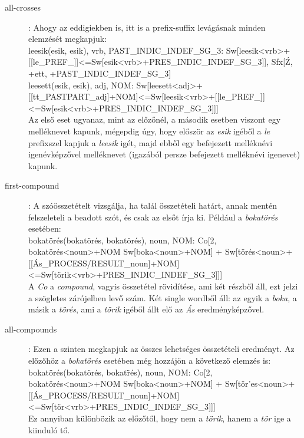 \documentclass{article}
\begin{document}
\begin{description}
\item[all-crosses]: Ahogy az eddigiekben is, itt is a prefix-suffix lev\'ag\'asnak minden elemz\'es\'et megkapjuk: \\

leesik(esik, esik), vrb, PAST\_INDIC\_INDEF\_SG\_3: Sw[leesik<vrb>+[[le\_PREF\_]]<=Sw[esik<vrb>+{PRES\_INDIC\_INDEF\_SG\_3}]], Sfx[Ź, +ett, +{PAST\_INDIC\_INDEF\_SG\_3}] \\

leesett(esik, esik), adj, NOM: Sw[leesett<adj>+[[tt\_PASTPART\_adj]+{NOM}]<=Sw[leesik<vrb>+[[le\_PREF\_]]<=Sw[esik<vrb>+{PRES\_INDIC\_INDEF\_SG\_3}]]] \\

Az els\H{o} eset ugyanaz, mint az el\H{o}z\H{o}n\'el, a m\'asodik esetben viszont egy mell\'eknevet kapunk, m\'egepdig \'ugy, hogy el\H{o}sz\"or az \textit{esik} ig\'eb\H{o}l a \textit{le} prefixszel kapjuk a \textit{leesik} ig\'et, majd ebb\H{o}l egy befejezett mell\'ekn\'evi igen\'evk\'epz\H{o}vel mell\'eknevet (igaz\'ab\'ol persze befejezett mell\'ekn\'evi igenevet) kapunk. \par

\item[first-compound]: A sz\'o\"osszet\'etelt vizsg\'alja, ha tal\'al \"osszet\'eteli hat\'art, annak ment\'en felszeleteli a beadott sz\'ot, \'es csak az els\H{o}t \'{i}rja ki. P\'eld\'aul a \textit{bokat\"or\'es} eset\'eben: \\

bokat\"or\'es(bokat\"or\'es, bokat\"or\'es), noun, NOM: Co[2, bokat\"or\'es<noun>+{NOM} Sw[boka<noun>+{NOM}] + Sw[t\"or\'es<noun>+[[\'As\_PROCESS/RESULT\_noun]+{NOM}]<=Sw[t\"orik<vrb>+{PRES\_INDIC\_INDEF\_SG\_3}]]] \\

A \textit{Co} a \textit{compound}, vagyis \"osszet\'etel r\"ovid\'{i}t\'ese, ami k\'et r\'eszb\H{o}l \'all, ezt jelzi a sz\"ogletes z\'ar\'ojelben lev\H{o} sz\'am. K\'et single wordb\H{o}l \'all: az egyik a \textit{boka}, a m\'asik a \textit{t\"or\'es}, ami a \textit{t\"orik} ig\'eb\H{o}l \'allt el\H{o} az \textit{\'As} eredm\'enyk\'epz\H{o}vel. \\ 

\item[all-compounds]: Ezen a szinten megkapjuk az \"osszes lehets\'eges \"osszet\'eteli eredm\'enyt. Az el\H{o}z\H{o}h\"oz a \textit{bokat\"or\'es} eset\'eben m\'eg hozz\'aj\"on a k\"ovetkez\H{o} elemz\'es is: \\

bokat\"or\'es(bokat\"or\'es, bokat\"r\'es), noun, NOM: Co[2, bokat\"or\'es<noun>+{NOM} Sw[boka<noun>+{NOM}] + Sw[t\"or'es<noun>+[[\'As\_PROCESS/RESULT\_noun]+{NOM}]<=Sw[t\"or<vrb>+{PRES\_INDIC\_INDEF\_SG\_3}]]] \\

Ez annyiban k\"ul\"onb\"ozik az el\H{o}z\H{o}t\H{o}l, hogy nem a \textit{t\"orik}, hanem a \textit{t\"or} ige a kiindul\'o t\H{o}. \\

\end{description}
\end{document}
